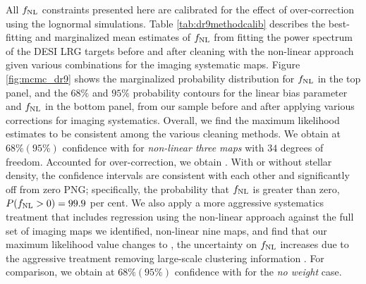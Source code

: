 All $f_{\rm NL}$ constraints presented here are calibrated for the effect of over-correction using the lognormal simulations. Table \ref{tab:dr9methodcalib} describes the best-fitting and marginalized mean estimates of $f_{\rm NL}$ from fitting the power spectrum of the DESI LRG targets before and after cleaning with the non-linear approach given various combinations for the imaging systematic maps. Figure \ref{fig:mcmc_dr9} shows the marginalized probability distribution for $f_{\rm NL}$ in the top panel, and the $68\%$ and $95\%$ probability contours for the linear bias parameter and $f_{\rm NL}$ in the bottom panel, from our sample before and after applying various corrections for imaging systematics. Overall, we find the maximum likelihood estimates to be consistent among the various cleaning methods. We obtain  at $68\%(95\%)$ confidence with  for \textit{non-linear three maps} with $34$ degrees of freedom. Accounted for over-correction, we obtain . With or without stellar density, the confidence intervals are consistent with each other and significantly off from zero PNG; specifically, the probability that $f_{\rm NL}$ is greater than zero, $P(f_{\rm NL} >0)=99.9$ per cent. We also apply a more aggressive systematics treatment that includes regression using the non-linear approach against the full set of imaging maps we identified, non-linear nine maps, and find that  our maximum
likelihood value changes  to ,   the uncertainty on $f_{\rm NL}$ increases due
to the aggressive treatment removing large-scale clustering information .  For comparison, we obtain  at $68\% (95\%)$ confidence with  for the \textit{no weight} case.

